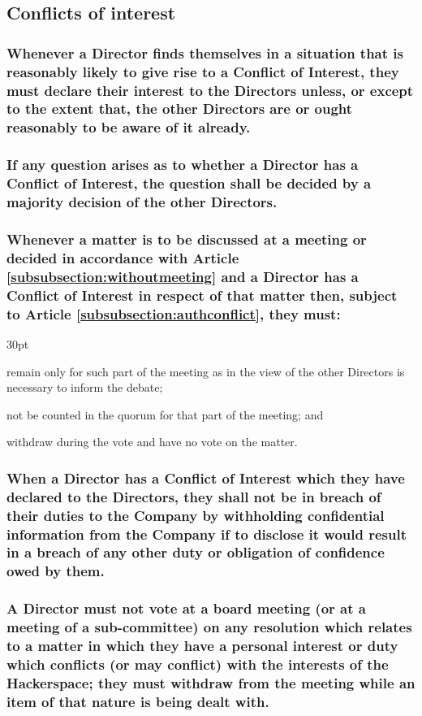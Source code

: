 \documentclass[12pt]{article}
\def\clauseindent{30pt}
\newenvironment{subindentpara}{\begin{adjustwidth}{\clauseindent}{}\begin{hanginglist}}{\end{hanginglist}\end{adjustwidth}}
\begin{document}
\subsection{Conflicts of interest}
\subsubsection{Whenever a Director finds themselves in a situation that is reasonably likely to give rise to a Conflict of Interest, they must declare their interest to the Directors unless, or except to the extent that, the other Directors are or ought reasonably to be aware of it already.}
\subsubsection{If any question arises as to whether a Director has a Conflict of Interest, the question shall be decided by a majority decision of the other Directors.}
\subsubsection{\label{subsubsubsection:directornovote}Whenever a matter is to be discussed at a meeting or decided in accordance with Article \ref{subsubsection:withoutmeeting} and a Director has a Conflict of Interest in respect of that matter then, subject to Article \ref{subsubsection:authconflict}, they must:}
\begin{subindentpara}
  \item remain only for such part of the meeting as in the view of the other Directors is necessary to inform the debate;
  \item not be counted in the quorum for that part of the meeting; and
  \item withdraw during the vote and have no vote on the matter.
\end{subindentpara}
\subsubsection{When a Director has a Conflict of Interest which they have declared to the Directors, they shall not be in breach of their duties to the Company by withholding confidential information from the Company if to disclose it would result in a breach of any other duty or obligation of confidence owed by them.}
\subsubsection{\label{subsubsubsection:withdraw}A Director must not vote at a board meeting (or at a meeting of a sub-committee) on any resolution which relates to a matter in which they have a personal interest or duty which conflicts (or may conflict) with the interests of the Hackerspace; they must withdraw from the meeting while an item of that nature is being dealt with.}
\end{document}
